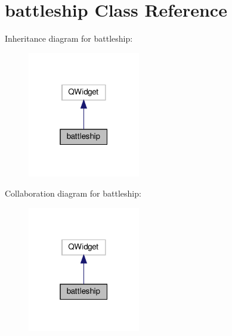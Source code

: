 \hypertarget{classbattleship}{}\section{battleship Class Reference}
\label{classbattleship}


Inheritance diagram for battleship\+:\nopagebreak
\begin{figure}[H]
\begin{center}
\leavevmode
\includegraphics[width=139pt]{classbattleship__inherit__graph}
\end{center}
\end{figure}


Collaboration diagram for battleship\+:\nopagebreak
\begin{figure}[H]
\begin{center}
\leavevmode
\includegraphics[width=139pt]{classbattleship__coll__graph}
\end{center}
\end{figure}
